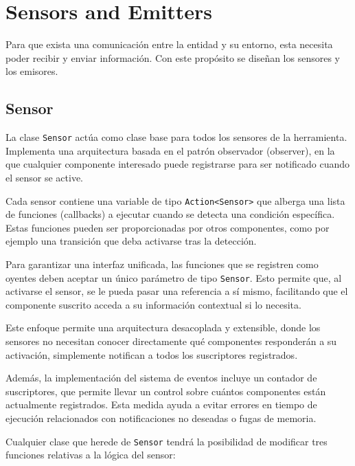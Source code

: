 \section{Sensors and Emitters}

Para que exista una comunicación entre la entidad y su entorno, esta necesita poder recibir y enviar información. Con este propósito se diseñan los sensores y los emisores.\\

\subsection{Sensor}

La clase \texttt{Sensor} actúa como clase base para todos los sensores de la herramienta. Implementa una arquitectura basada en el patrón observador (observer), en la que cualquier componente interesado puede registrarse para ser notificado cuando el sensor se active.

Cada sensor contiene una variable de tipo \texttt{Action<Sensor>} que alberga una lista de funciones (callbacks) a ejecutar cuando se detecta una condición específica. Estas funciones pueden ser proporcionadas por otros componentes, como por ejemplo una transición que deba activarse tras la detección.

Para garantizar una interfaz unificada, las funciones que se registren como oyentes deben aceptar un único parámetro de tipo \texttt{Sensor}. Esto permite que, al activarse el sensor, se le pueda pasar una referencia a sí mismo, facilitando que el componente suscrito acceda a su información contextual si lo necesita.

Este enfoque permite una arquitectura desacoplada y extensible, donde los sensores no necesitan conocer directamente qué componentes responderán a su activación, simplemente notifican a todos los suscriptores registrados.

Además, la implementación del sistema de eventos incluye un contador de suscriptores, que permite llevar un control sobre cuántos componentes están actualmente registrados. Esta medida ayuda a evitar errores en tiempo de ejecución relacionados con notificaciones no deseadas o fugas de memoria.

Cualquier clase que herede de \texttt{Sensor} tendrá la posibilidad de modificar tres funciones relativas a la lógica del sensor:

